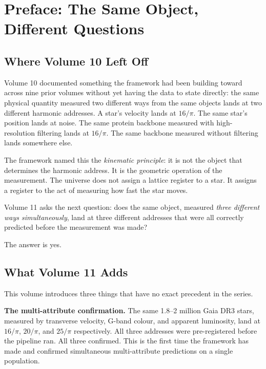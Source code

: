 \documentclass[11pt, letterpaper, openany]{book}
\begin{document}
\tableofcontents
\clearpage

\chapter*{Preface: The Same Object, Different Questions}

\section*{Where Volume 10 Left Off}

Volume 10 documented something the framework had been building toward across
nine prior volumes without yet having the data to state directly: the same
physical quantity measured two different ways from the same objects lands at
two different harmonic addresses. A star's velocity lands at $16/\pi$. The
same star's position lands at noise. The same protein backbone measured with
high-resolution filtering lands at $16/\pi$. The same backbone measured
without filtering lands somewhere else.

The framework named this the \textit{kinematic principle}: it is not the
object that determines the harmonic address. It is the geometric operation
of the measurement. The universe does not assign a lattice register to a
star. It assigns a register to the act of measuring how fast the star moves.

Volume 11 asks the next question: does the same object, measured \textit{three
different ways simultaneously}, land at three different addresses that were
all correctly predicted before the measurement was made?

The answer is yes.

\section*{What Volume 11 Adds}

This volume introduces three things that have no exact precedent in the series.

\textbf{The multi-attribute confirmation.} The same 1.8--2 million Gaia DR3
stars, measured by transverse velocity, G-band colour, and apparent luminosity,
land at $16/\pi$, $20/\pi$, and $25/\pi$ respectively. All three addresses
were pre-registered before the pipeline ran. All three confirmed. This is the
first time the framework has made and confirmed simultaneous multi-attribute
predictions on a single population.
\end{document}
